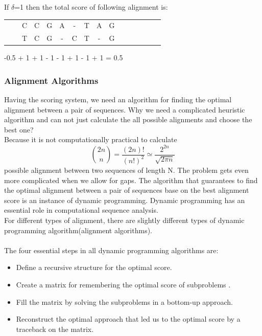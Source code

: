 \documentclass[11pt,a4paper]{report}
\begin{document}
If $\delta$=1 then the total score of following alignment is:
 
\begin{center}
	\begin{tabular}{c *{12}cccc}
        & & C & C & G & A & - & T & A & G && \\
 	  & & T  & C & G &  -  & C   &  T & -  & G & \\
    	                                 
	\end{tabular}
\end{center} 

-0.5 + 1 + 1 - 1 - 1 + 1 - 1 + 1 = 0.5

\subsubsection{Alignment Algorithms} \label{Alignment Algorithms}

Having the scoring system, we need an algorithm for finding the optimal alignment 
between a pair of sequences. Why we need a complicated heuristic algorithm and can
not just calculate the all possible alignments and choose the best one?\\
Because it is not computationally practical to calculate  
$$ \binom{2n}{n} = \frac{(2n)!}{(n!)^2} \simeq \frac{2^{2n}}{\sqrt{2\pi n}} $$
possible alignment between two sequences of length N. The problem gets even more complicated when we allow for gaps. 
The algorithm that guarantees to find the optimal alignment between a pair of sequences base on the best alignment 
score is an instance of dynamic programming. 
Dynamic programming has an essential role in computational sequence analysis.\\ 
For different types of alignment, there are slightly different types of dynamic programming algorithm(alignment algorithms).\\\\

The four essential steps in all dynamic programming algorithms are:

\begin{itemize} 
	\item Define a recursive structure for the optimal score\cite{eddydynamic}.
	\item  Create a  matrix for remembering the optimal score of subproblems \cite{eddydynamic}.	
	\item Fill the matrix by solving the  subproblems in a bottom-up approach\cite{eddydynamic}.
	\item Reconstruct the optimal approach that led us to the optimal score by a traceback on the matrix\cite{eddydynamic}.
\end{itemize}
\end{document}
